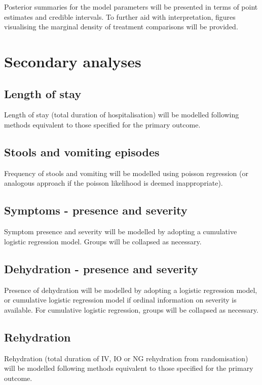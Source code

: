 \documentclass[a4paper]{article}
\begin{document}
Posterior summaries for the model parameters will be presented in terms of point estimates and credible intervals.
To further aid with interpretation, figures visualising the marginal density of treatment comparisons will be provided.

\section{Secondary analyses}

\subsection{Length of stay}

Length of stay (total duration of hospitalisation) will be modelled following methods equivalent to those specified for the primary outcome. 

\subsection{Stools and vomiting episodes}

Frequency of stools and vomiting will be modelled using poisson regression (or analogous approach if the poisson likelihood is deemed inappropriate).

\subsection{Symptoms - presence and severity}

Symptom presence and severity will be modelled by adopting a cumulative logistic regression model.
Groups will be collapsed as necessary.

\subsection{Dehydration - presence and severity}

Presence of dehydration will be modelled by adopting a logistic regression model, or cumulative logistic regression model if ordinal information on severity is available.
For cumulative logistic regression, groups will be collapsed as necessary.

\subsection{Rehydration}

Rehydration (total duration of IV, IO or NG rehydration from randomisation) will be modelled following methods equivalent to those specified for the primary outcome. 
\end{document}

